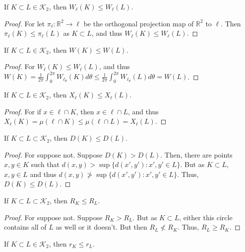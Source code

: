 \documentclass[crop=false,class=article,oneside]{standalone}
\begin{document}
        \begin{theorem}
        If $K\subset L \in \mathscr{K}_2$, then $W_{\ell}(K) \leq W_{\ell}(L)$.
        \end{theorem}
        \begin{proof}
        For let $\pi_{\ell}:\mathbb{R}^2 \rightarrow \ell$ be the orthogonal projection map of $\mathbb{R}^2$ to $\ell$. Then $\pi_{\ell}(K)\leq \pi_{\ell}(L)$ as $K\subset L$, and thus $W_{\ell}(K)\leq W_{\ell}(L)$.
        \end{proof}
        \begin{theorem}
        If $K\subset L\in \mathscr{K}_2$, then $W(K)\leq W(L)$.
        \end{theorem}
        \begin{proof}
        For $W_{\ell}(K)\leq W_{\ell}(L)$, and thus $W(K)=\frac{1}{2\pi}\int_{0}^{2\pi}W_{\ell_{\theta}}(K)d\theta \leq \frac{1}{2\pi}\int_{0}^{2\pi}W_{\ell_{\theta}}(L)d\theta=W(L)$.
        \end{proof}
        \begin{theorem}
        If $K\subset L\in \mathscr{K}_2$, then $X_{\ell}(K)\leq X_{\ell}(L)$.
        \end{theorem}
        \begin{proof}
        For if $x\in \ell\cap K$, then $x\in \ell\cap L$, and thus $X_{\ell}(K)=\mu(\ell\cap K) \leq \mu(\ell\cap L)=X_{\ell}(L)$.
        \end{proof}
        \begin{theorem}
        If $K\subset L\subset \mathscr{K}_2$, then $D(K)\leq D(L)$.
        \end{theorem}
        \begin{proof}
        For suppose not. Suppose $D(K)>D(L)$. Then, there are points $x,y\in K$ such that $d(x,y)> \sup\{d(x',y'):x',y'\in L\}$. But as $K\subset L$, $x,y\in L$ and thus $d(x,y) \not> \sup\{d(x',y'):x',y'\in L\}$. Thus, $D(K)\leq D(L)$.
        \end{proof}
        \begin{theorem}
        If $K\subset L \subset \mathscr{K}_2$, then $R_K\leq R_L$.
        \end{theorem}
        \begin{proof}
        For suppose not. Suppose $R_K>R_L$. But as $K\subset L$, either this circle contains all of $L$ as well or it doesn't. But then $R_L \not<R_K$. Thus, $R_L\geq R_K$.
        \end{proof}
        \begin{theorem}
        If $K\subset L \in \mathscr{K}_2$, then $r_K \leq r_L$.
        \end{theorem}
\end{document}
